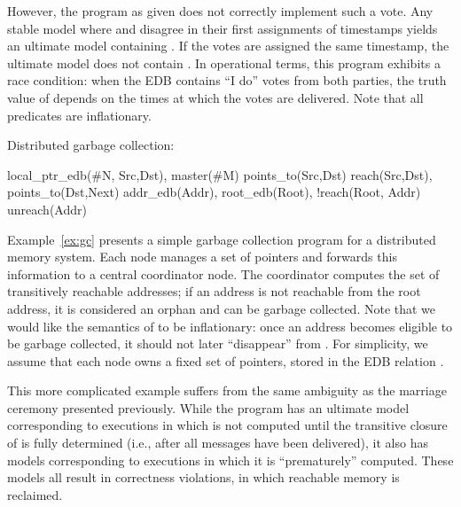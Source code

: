 However, the \lang program as given does not correctly implement such a vote.
Any stable model where  and 
disagree in their first assignments of timestamps yields an ultimate model
containing .  If the votes are assigned the same timestamp,
the ultimate model does not contain . In operational terms,
this program exhibits a race condition: when the EDB contains ``I do'' votes
from both parties, the truth value of  depends on the times
at which the votes are delivered. Note that all predicates are inflationary.

\begin{example}
\label{ex:gc}
Distributed garbage collection:

\begin{Drules}
        {local_ptr_edb(#N, Src,Dst), master(#M)}
        {points_to(Src,Dst)}
        {reach(Src,Dst), points_to(Dst,Next)}
        {addr_edb(Addr), root_edb(Root), !reach(Root, Addr)}
   {unreach(Addr)}
\end{Drules}
\end{example}
Example~\ref{ex:gc} presents a simple garbage collection program for a
distributed memory system. Each node manages a set of pointers and forwards this
information to a central coordinator node. The coordinator computes the set of
transitively reachable addresses; if an address is not reachable from the root
address, it is considered an orphan and can be garbage collected. Note that we
would like the semantics of  to be inflationary: once an
address becomes eligible to be garbage collected, it should not later
``disappear'' from . For simplicity, we assume that each node
owns a fixed set of pointers, stored in the EDB relation
. 

This more complicated example suffers from the same ambiguity as the marriage
ceremony presented previously.  While the program has an ultimate model
corresponding to executions in which  is not computed until the
transitive closure of  is fully determined (i.e., after all
messages have been delivered), it also has models corresponding to executions in
which it is ``prematurely'' computed.  These models all result in correctness
violations, in which reachable memory is reclaimed.

